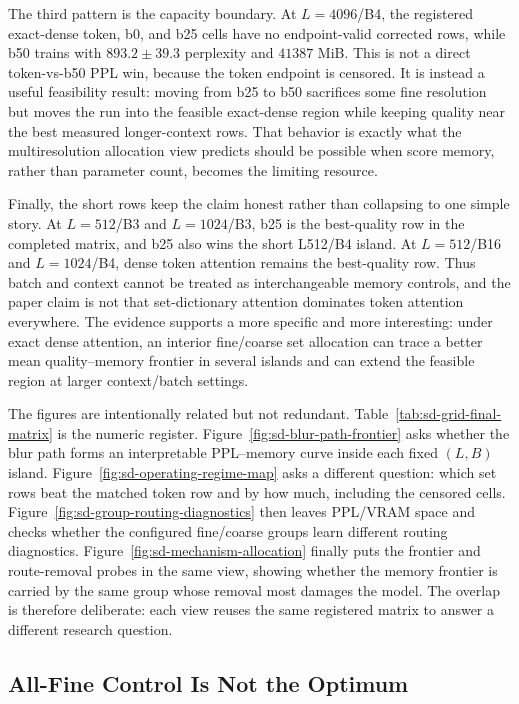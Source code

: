 \documentclass{article}
\theoremstyle{plain}
\theoremstyle{definition}
\theoremstyle{remark}
\begin{document}
The third pattern is the capacity boundary.  At $L=4096$/B4, the registered
exact-dense token, b0, and b25 cells have no endpoint-valid corrected rows,
while b50 trains with $893.2\pm39.3$ perplexity and $41387$ MiB.  This is not
a direct token-vs-b50 PPL win, because the token endpoint is censored.  It is
instead a useful feasibility result: moving from b25 to b50 sacrifices some
fine resolution but moves the run into the feasible exact-dense region while
keeping quality near the best measured longer-context rows.  That behavior is
exactly what the multiresolution allocation view predicts should be possible
when score memory, rather than parameter count, becomes the limiting resource.

Finally, the short rows keep the claim honest rather than collapsing to one
simple story.  At $L=512$/B3 and $L=1024$/B3, b25 is the best-quality row in
the completed matrix, and b25 also wins the short L512/B4 island.  At
$L=512$/B16 and $L=1024$/B4, dense token attention remains the best-quality
row.  Thus batch and context cannot be treated as interchangeable memory
controls, and the paper claim is not that set-dictionary attention dominates
token attention everywhere.  The evidence supports a more specific and more
interesting: under exact dense attention, an interior fine/coarse set
allocation can trace a better mean quality--memory frontier in several
islands and can extend the feasible region at larger context/batch
settings.

The figures are intentionally related but not redundant.  Table~\ref{tab:sd-grid-final-matrix}
is the numeric register.  Figure~\ref{fig:sd-blur-path-frontier} asks whether
the blur path forms an interpretable PPL--memory curve inside each fixed
$(L,B)$ island.  Figure~\ref{fig:sd-operating-regime-map} asks a different
question: which set rows beat the matched token row and by how much, including
the censored cells.  Figure~\ref{fig:sd-group-routing-diagnostics} then leaves
PPL/VRAM space and checks whether the configured fine/coarse groups learn
different routing diagnostics.  Figure~\ref{fig:sd-mechanism-allocation} finally
puts the frontier and route-removal probes in the same view, showing whether
the memory frontier is carried by the same group whose removal most damages
the model.  The overlap is therefore deliberate: each view reuses the same
registered matrix to answer a different research question.

\subsection{All-Fine Control Is Not the Optimum}
\label{sec:results-all-fine-control}
\end{document}
